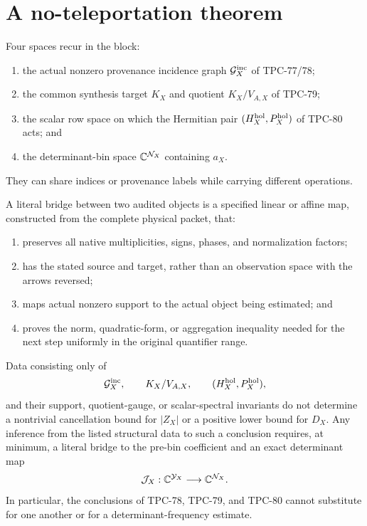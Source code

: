 \section{A no-teleportation theorem}
\label{sec:no-teleportation}

Four spaces recur in the block:
\begin{enumerate}[label=(\alph*),leftmargin=2.2em]
\item the actual nonzero provenance incidence graph
\(\mathcal G_X^{\rm inc}\) of TPC-77/78;
\item the common synthesis target \(K_X\) and quotient
\(K_X/V_{A,X}\) of TPC-79;
\item the scalar row space on which the Hermitian pair
\((H_X^{\rm hol},P_X^{\rm hol})\) of TPC-80 acts; and
\item the determinant-bin space \(\mathbb C^{\mathcal N_X}\) containing \(a_X\).
\end{enumerate}
They can share indices or provenance labels while carrying different
operations.

\begin{definition}
\label{def:literal-bridge}
A literal bridge between two audited objects is a specified linear or
affine map, constructed from the complete physical packet, that:
\begin{enumerate}[label=(B\arabic*),leftmargin=2.7em]
\item preserves all native multiplicities, signs, phases, and
normalization factors;
\item has the stated source and target, rather than an observation
space with the arrows reversed;
\item maps actual nonzero support to the actual object being
estimated; and
\item proves the norm, quadratic-form, or aggregation inequality
needed for the next step uniformly in the original quantifier range.
\end{enumerate}
\end{definition}

\begin{theorem}[No teleportation]
\label{thm:no-teleportation}
Data consisting only of
\[
 \mathcal G_X^{\rm inc},\qquad K_X/V_{A,X},\qquad
 (H_X^{\rm hol},P_X^{\rm hol}),
\]
and their support, quotient-gauge, or scalar-spectral invariants do
not determine a nontrivial cancellation bound for \(|Z_X|\) or a
positive lower bound for \(D_X\).  Any inference from the listed
structural data to such a conclusion requires, at minimum, a literal
bridge
to the pre-bin coefficient and an exact determinant map
\[
 \mathcal J_X:\mathbb C^{\mathcal Y_X}\longrightarrow\mathbb C^{\mathcal N_X}.
\]
In particular, the conclusions of TPC-78, TPC-79, and TPC-80 cannot
substitute for one another or for a determinant-frequency estimate.
\end{theorem}

